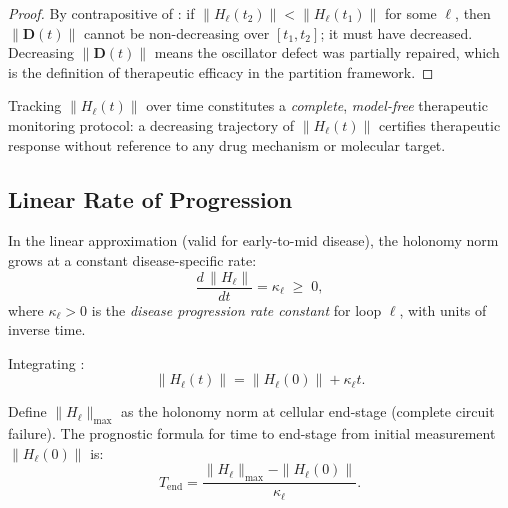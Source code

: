 \begin{proof}
By contrapositive of : if
$\|H_\ell(t_2)\| < \|H_\ell(t_1)\|$ for some $\ell$, then $\|\mathbf{D}(t)\|$
cannot be non-decreasing over $[t_1, t_2]$; it must have decreased.
Decreasing $\|\mathbf{D}(t)\|$ means the oscillator defect was partially
repaired, which is the definition of therapeutic efficacy in the partition
framework.
\end{proof}

\begin{corollary}
\label{cor:ch04-therapeutic-monitoring}
Tracking $\|H_\ell(t)\|$ over time constitutes a \emph{complete},
\emph{model-free} therapeutic monitoring protocol: a decreasing trajectory
of $\|H_\ell(t)\|$ certifies therapeutic response without reference to any
drug mechanism or molecular target.
\end{corollary}

\subsection{Linear Rate of Progression}

\begin{definition}
\label{def:ch04-progression-rate}
In the linear approximation (valid for early-to-mid disease), the holonomy
norm grows at a constant disease-specific rate:
\begin{equation}
\label{eq:ch04-progression-rate}
    \frac{d\,\|H_\ell\|}{dt} = \kappa_\ell \;\geq\; 0,
\end{equation}
where $\kappa_\ell > 0$ is the \emph{disease progression rate constant} for
loop $\ell$, with units of inverse time.
\end{definition}

Integrating :
\begin{equation}
    \|H_\ell(t)\| = \|H_\ell(0)\| + \kappa_\ell t.
\end{equation}

\begin{definition}
\label{def:ch04-end-stage}
Define $\|H_\ell\|_{\max}$ as the holonomy norm at cellular end-stage
(complete circuit failure).  The prognostic formula for time to end-stage
from initial measurement $\|H_\ell(0)\|$ is:
\begin{equation}
\label{eq:ch04-T-end}
    T_{\mathrm{end}} = \frac{\|H_\ell\|_{\max} - \|H_\ell(0)\|}{\kappa_\ell}.
\end{equation}
\end{definition}

